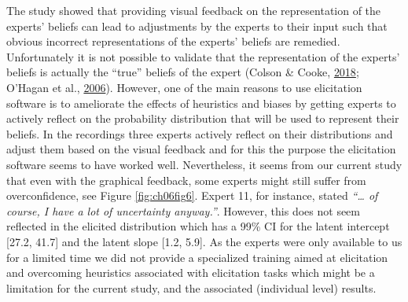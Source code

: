 \documentclass[openright,titlepage,12pt,a4paper]{book}
\begin{document}
The study showed that providing visual feedback on the representation of the experts' beliefs can lead to adjustments by the experts to their input such that obvious incorrect representations of the experts' beliefs are remedied. Unfortunately it is not possible to validate that the representation of the experts' beliefs is actually the ``true'' beliefs of the expert (Colson \& Cooke, \protect\hyperlink{ref-colson_expert_2018}{2018}; O'Hagan et al., \protect\hyperlink{ref-ohagan_uncertain_2006}{2006}). However, one of the main reasons to use elicitation software is to ameliorate the effects of heuristics and biases by getting experts to actively reflect on the probability distribution that will be used to represent their beliefs. In the recordings three experts actively reflect on their distributions and adjust them based on the visual feedback and for this the purpose the elicitation software seems to have worked well. Nevertheless, it seems from our current study that even with the graphical feedback, some experts might still suffer from overconfidence, see Figure \ref{fig:ch06fig6}. Expert 11, for instance, stated \emph{``\ldots{} of course, I have a lot of uncertainty anyway.''}. However, this does not seem reflected in the elicited distribution which has a 99\% CI for the latent intercept {[}27.2, 41.7{]} and the latent slope {[}1.2, 5.9{]}. As the experts were only available to us for a limited time we did not provide a specialized training aimed at elicitation and overcoming heuristics associated with elicitation tasks which might be a limitation for the current study, and the associated (individual level) results.
\end{document}
